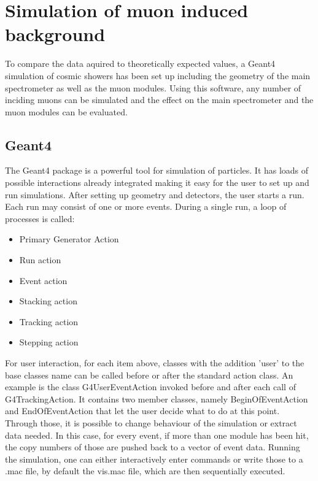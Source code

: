 
\chapter{Simulation of muon induced background}
\label{ch:Simulation of muon induced background}
  To compare the data aquired to theoretically expected values, a Geant4 simulation of cosmic showers has been set up including the geometry of the main spectrometer as well as the muon modules. Using this software, any number of inciding muons can be simulated and the effect on the main spectrometer and the muon modules can be evaluated.
  \section{Geant4}
  \label{ch:Simulation software:sec:Geant4}
  The Geant4 package is a powerful tool for simulation of particles. It has loads of possible interactions already integrated making it easy for the user to set up and run simulations. After setting up geometry and detectors, the user starts a run. Each run may consist of one or more events. During a single run, a loop of processes is called:
  \begin{itemize}	
  	\item Primary Generator Action
  	\item Run action
  	\item Event action
  	\item Stacking action
  	\item Tracking action
  	\item Stepping action
  \end{itemize}
  For user interaction, for each item above, classes with the addition 'user' to the base classes name can be called before or after the standard action class. An example is the class G4UserEventAction invoked before and after each call of G4TrackingAction. It contains two member classes, namely BeginOfEventAction and EndOfEventAction that let the user decide what to do at this point. Through those, it is possible to change behaviour of the simulation or extract data needed. In this case, for every event, if more than one module has been hit, the copy numbers of those are pushed back to a vector of event data.  
  Running the simulation, one can either interactively enter commands or write those to a .mac file, by default the vis.mac file, which are then sequentially executed. 


